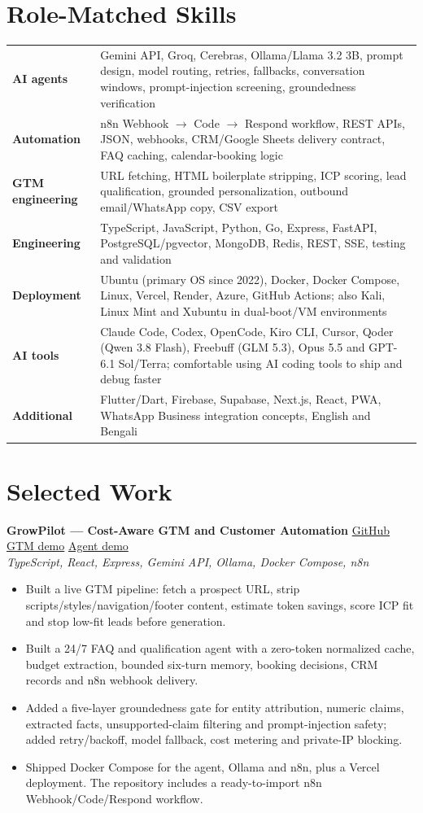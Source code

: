 \documentclass[10pt,a4paper]{article}
\newcommand{\project}[3]{\textbf{#1} \hfill {\small #2}\\{\small\textit{#3}}\par}
\begin{document}
\section{Role-Matched Skills}
{\small
\begin{tabularx}{\linewidth}{@{}>{\bfseries}p{1.22in} >{\raggedright\arraybackslash}X@{}}
AI agents & Gemini API, Groq, Cerebras, Ollama/Llama 3.2 3B, prompt design, model routing, retries, fallbacks, conversation windows, prompt-injection screening, groundedness verification\\
Automation & n8n Webhook $\rightarrow$ Code $\rightarrow$ Respond workflow, REST APIs, JSON, webhooks, CRM/Google Sheets delivery contract, FAQ caching, calendar-booking logic\\
GTM engineering & URL fetching, HTML boilerplate stripping, ICP scoring, lead qualification, grounded personalization, outbound email/WhatsApp copy, CSV export\\
Engineering & TypeScript, JavaScript, Python, Go, Express, FastAPI, PostgreSQL/pgvector, MongoDB, Redis, REST, SSE, testing and validation\\
Deployment & Ubuntu (primary OS since 2022), Docker, Docker Compose, Linux, Vercel, Render, Azure, GitHub Actions; also Kali, Linux Mint and Xubuntu in dual-boot/VM environments\\
AI tools & Claude Code, Codex, OpenCode, Kiro CLI, Cursor, Qoder (Qwen 3.8 Flash), Freebuff (GLM 5.3), Opus 5.5 and GPT-6.1 Sol/Terra; comfortable using AI coding tools to ship and debug faster\\
Additional & Flutter/Dart, Firebase, Supabase, Next.js, React, PWA, WhatsApp Business integration concepts, English and Bengali
\end{tabularx}}

\section{Selected Work}
\project{GrowPilot --- Cost-Aware GTM and Customer Automation}
{\href{https://github.com/Mayamoho/GrowPilot}{GitHub} \textbar{} \href{https://gtm.abukawser.xyz}{GTM demo} \textbar{} \href{https://agent.abukawser.xyz}{Agent demo}}
{TypeScript, React, Express, Gemini API, Ollama, Docker Compose, n8n}
\begin{itemize}
\item Built a live GTM pipeline: fetch a prospect URL, strip scripts/styles/navigation/footer content, estimate token savings, score ICP fit and stop low-fit leads before generation.
\item Built a 24/7 FAQ and qualification agent with a zero-token normalized cache, budget extraction, bounded six-turn memory, booking decisions, CRM records and n8n webhook delivery.
\item Added a five-layer groundedness gate for entity attribution, numeric claims, extracted facts, unsupported-claim filtering and prompt-injection safety; added retry/backoff, model fallback, cost metering and private-IP blocking.
\item Shipped Docker Compose for the agent, Ollama and n8n, plus a Vercel deployment. The repository includes a ready-to-import n8n Webhook/Code/Respond workflow.
\end{itemize}
\end{document}

